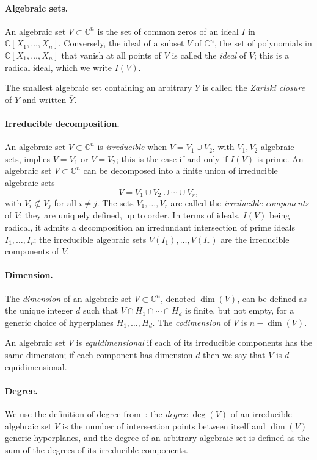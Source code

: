 \documentclass[12pt]{article}
\def\C{\mathbb{C}}
\begin{document}
\paragraph*{Algebraic sets.} An algebraic set $V \subset \C^n$ is the set of common 
zeros of an ideal $I$ in $\C[X_1,\hdots,X_n].$ Conversely, the ideal
of a subset $V$ of $\C^n$, the set of polynomials in
$\C[X_1,\dots,X_n]$ that vanish at all points of $V$ is called the
\textit{ideal} of $V$; this is a radical ideal, which we write $I(V)$.

The smallest algebraic set containing an arbitrary $Y$ is called 
the {\em Zariski closure} of $Y$ and written $\overline Y$.

\paragraph*{Irreducible decomposition.}
An algebraic set $V \subset \C^n$ is \textit{irreducible} when $V =
V_1 \cup V_2$, with $V_1,V_2$ algebraic sets, implies $V=V_1$ or
$V=V_2$; this is the case if and only if $I(V)$ is prime.  An
algebraic set $V \subset \C^n$ can be decomposed into a finite union
of irreducible algebraic sets
\[
V = V_1 \cup V_2 \cup \cdots \cup V_r,
\]
with $V_i \not \subset V_j$ for all $i \ne j$. The sets
$V_1,\dots,V_r$ are called the {\em irreducible components} of $V$;
they are uniquely defined, up to order. In terms of ideals, $I(V)$
being radical, it admits a decomposition an irredundant intersection
of prime ideals $I_1,\dots,I_r$; the irreducible algebraic sets
$V(I_1),\dots,V(I_r)$ are the irreducible components of $V$.

\paragraph*{Dimension.}
The \textit{dimension} of an algebraic set $V \subset \C^n$, denoted
$\dim(V)$, can be defined as the unique integer $d$ such that $V \cap
H_1 \cap \cdots \cap H_d$ is finite, but not empty, for a generic
choice of hyperplanes $H_1,\dots,H_d$. The \textit{codimension} of $V$
is $n - \dim (V)$. 

An algebraic set $V$ is \textit{equidimensional} if each of its
irreducible components has the same dimension; if each component has
dimension $d$ then we say that $V$ is $d$-equidimensional.

\paragraph*{Degree.}
We use the definition of degree from~\cite{H}: the \textit{degree}
$\deg(V)$ of an irreducible algebraic set $V$ is the number of
intersection points between itself and $\dim (V)$ generic hyperplanes,
and the degree of an arbitrary algebraic set is defined as the sum of
the degrees of its irreducible components.
\end{document}
